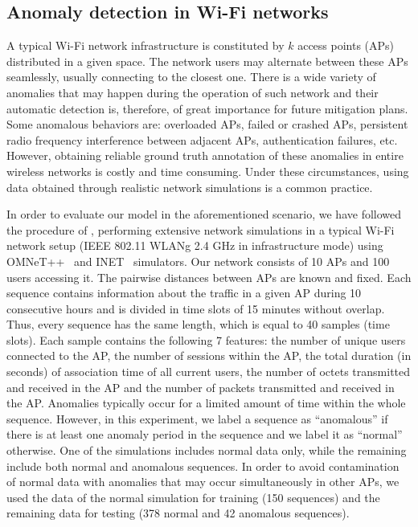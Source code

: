 \subsection{Anomaly detection in Wi-Fi networks}
\label{sec:wi_fi}
A typical Wi-Fi network infrastructure is constituted by $k$ access points (APs) distributed in a given space. The network users may alternate between these APs seamlessly, usually connecting to the closest one. There is a wide variety of anomalies that may happen during the operation of such network and their automatic detection is, therefore, of great importance for future mitigation plans. Some anomalous behaviors are: overloaded APs, failed or crashed APs, persistent radio frequency interference between adjacent APs, authentication failures, etc. However, obtaining reliable ground truth annotation of these anomalies in entire wireless networks is costly and time consuming. Under these circumstances, using data obtained through realistic network simulations is a common practice. 

In order to evaluate our model in the aforementioned scenario, we have followed the procedure of \citet{Anisa2017}, performing extensive network simulations in a typical Wi-Fi network setup (IEEE 802.11 WLANg 2.4 GHz in infrastructure mode) using OMNeT++~\cite{omnetpp} and INET~\cite{inet} simulators. Our network consists of 10 APs and 100 users accessing it. The pairwise distances between APs are known and fixed. Each sequence contains information about the traffic in a given AP during 10 consecutive hours and is divided in time slots of 15 minutes without overlap. Thus, every sequence has the same length, which is equal to 40 samples (time slots). Each sample contains the following 7 features: the number of unique users connected to the AP, the number of sessions within the AP, the total duration (in seconds) of association time of all current users, the number of octets transmitted and received in the AP and the number of packets transmitted and received in the AP. Anomalies typically occur for a limited amount of time within the whole sequence. However, in this experiment, we label a sequence as ``anomalous'' if there is at least one anomaly period in the sequence and we label it as ``normal'' otherwise. One of the simulations includes normal data only, while the remaining include both normal and anomalous sequences. In order to avoid contamination of normal data with anomalies that may occur simultaneously in other APs, we used the data of the normal simulation for training (150 sequences) and the remaining data for testing (378 normal and 42 anomalous sequences). 

